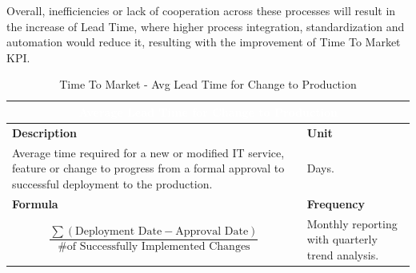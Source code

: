 Overall, inefficiencies or lack of cooperation across these processes will result in the increase of Lead Time, where higher process integration, standardization and automation would reduce it, resulting with the improvement of Time To Market KPI.




\begin{table}[h]
    \centering
    \renewcommand{\arraystretch}{1.6}
    \setlength{\arrayrulewidth}{0.6pt}

    \begin{tabularx}{\textwidth}{|X|X|}
    \hline
    \multicolumn{2}{|c|}{\cellcolor{mcblue}\textcolor{white}{\textbf{Average Lead Time for Change to Production}}} \\ \hline

    \rowcolor{mclightgray}
    \textbf{Description} & \textbf{Unit} \\ \hline
    Average time required for a new or modified IT service, feature or change to progress from a formal approval to successful deployment to the production. &
    Days. \\ \hline

    \rowcolor{mclightgray}
    \textbf{Formula} & \textbf{Frequency} \\ \hline
    \[
       \frac{\sum (\text{Deployment Date} - \text{Approval Date})}{\text{\# of Successfully Implemented Changes}}
    \]
     &
    Monthly reporting with quarterly trend analysis. \\ \hline

    \end{tabularx}

    \caption{Time To Market - Avg Lead Time for Change to Production}
    \label{tab:measurement_AverageLeadTimeforChangetoProduction}
\end{table}



